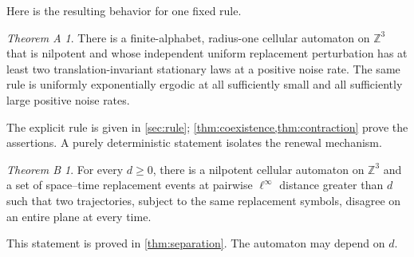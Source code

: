 \documentclass[11pt]{article}
\theoremstyle{plain}
\theoremstyle{definition}
\theoremstyle{remark}
\newtheorem*{mainA}{Theorem A}
\newtheorem*{mainB}{Theorem B}
\newcommand{\Z}{\mathbb Z}
\begin{document}
Here is the resulting behavior for one fixed rule.
\begin{mainA}
There is a finite-alphabet, radius-one cellular automaton on $\Z^3$ that is nilpotent and whose independent uniform replacement perturbation has at least two translation-invariant stationary laws at a positive noise rate. The same rule is uniformly exponentially ergodic at all sufficiently small and all sufficiently large positive noise rates.
\end{mainA}
The explicit rule is given in \cref{sec:rule}; \cref{thm:coexistence,thm:contraction} prove the assertions. A purely deterministic statement isolates the renewal mechanism.
\begin{mainB}
For every $d\geq0$, there is a nilpotent cellular automaton on $\Z^3$ and a set of space--time replacement events at pairwise $\ell^\infty$ distance greater than $d$ such that two trajectories, subject to the same replacement symbols, disagree on an entire plane at every time.
\end{mainB}
This statement is proved in \cref{thm:separation}. The automaton may depend on $d$.
\end{document}
